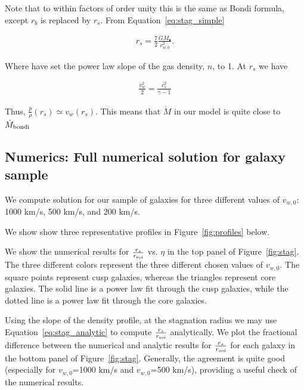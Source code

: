 \documentclass[usenatbib,fleqn]{mn2e}
\newcommand{\Mdotb}{\dot{M}_{\rm bondi}}
\newcommand{\rs}{r_s}
\newcommand{\rb}{r_b}
\newcommand{\vw}{v_w}
\newcommand{\kew}{\frac{v_w^2}{2}}
\newcommand{\cs}{\frac{p}{\rho}}
\newcommand{\Mbh}[1][]{M_{\bullet#1}}
\newcommand{\soi}{\rm soi}
\newcommand{\rsoi}{r_{\soi}}
\newcommand{\vwO}{v_{w,0}}
\newcommand{\x}{\frac{r_s}{\rsoi}}
\begin{document}
Note that to within factors of order unity this is the same as Bondi formula, except $\rb$ is replaced by $\rs$. 
From Equation~\ref{eq:stag_simple}

\begin{align}
\rs=\frac{7}{2}\frac{G \Mbh}{\vwO^2}.
\label{eq:rs_simple}
\end{align}

Where have set the power law slope of the gas density, $n$, to 1.  At $\rs$ we have

\begin{align}
\kew=\frac{c_s^2}{\gamma-1}
\end{align}

Thus, $\cs(\rs)\simeq \vw(\rs)$. This means that $\dot{M}$ in our model is quite close to $\Mdotb$



\subsection{Numerics: Full numerical solution for galaxy sample}
We compute solution for our sample of galaxies for three different values of $v_{w,0}$: 1000 km/s, 500 km/s, and 200 km/s. 

We show show three representative profiles in Figure~\ref{fig:profiles} below. 

We show the numerical results for $\x$ vs. $\eta$ in the top panel of
Figure~\ref{fig:stag}.  The three different colors represent the three
different chosen values of $\vwO$. The square points represent cusp
galaxies, whereas the triangles represent core galaxies.  The solid
line is a power law fit through the cusp galaxies, while the dotted
line is a power law fit through the core galaxies.

Using the slope of the density profile, at the stagnation radius we
may use Equation~\ref{eq:stag_analytic} to compute $\x$
analytically. We plot the fractional difference between the numerical
and analytic results for $\x$ for each galaxy in the bottom panel of
Figure~\ref{fig:stag}.  Generally, the agreement is quite good
(especially for $\vwO$=1000 km/s and $\vwO$=500 km/s), providing a
useful check of the numerical results.
\end{document}
